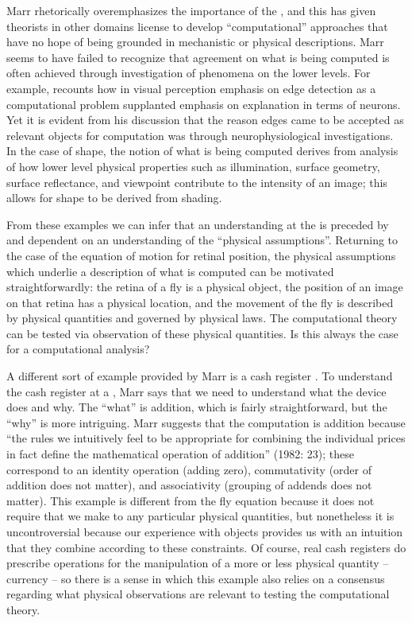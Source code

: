   Marr rhetorically overemphasizes the importance of the , and this has given theorists in other domains license to develop “computational” approaches that have no hope of being grounded in mechanistic or physical descriptions. Marr seems to have failed to recognize that agreement on what is being computed is often achieved through investigation of phenomena on the lower levels. For example, \citet{Marr1982} recounts how in visual perception emphasis on edge detection as a computational problem supplanted emphasis on explanation in terms of neurons. Yet it is evident from his discussion that the reason edges came to be accepted as relevant objects for computation was through neurophysiological investigations. In the case of shape, the notion of what is being computed derives from analysis of how lower level physical properties such as illumination, surface geometry, surface reflectance, and viewpoint contribute to the intensity of an image; this allows for shape to be derived from shading. 

From these examples we can infer that an understanding at the  is preceded by and dependent on an understanding of the “physical assumptions”. Returning to the case of the equation of motion for retinal position, the physical assumptions which underlie a description of what is computed can be motivated straightforwardly: the retina of a fly is a physical object, the position of an image on that retina has a physical location, and the movement of the fly is described by physical quantities and governed by physical laws. The computational theory can be tested via observation of these physical quantities. Is this always the case for a computational analysis?

A different sort of example provided by Marr is a cash register \citep{Marr1982}. To understand the cash register at a , Marr says that we need to understand what the device does and why. The “what” is addition, which is fairly straightforward, but the “why” is more intriguing. Marr suggests that the computation is addition because “the rules we intuitively feel to be appropriate for combining the individual prices in fact define the mathematical operation of addition” (1982: 23); these correspond to an identity operation (adding zero), commutativity (order of addition does not matter), and associativity (grouping of addends does not matter). This example is different from the fly equation because it does not require that we make  to any particular physical quantities, but nonetheless it is uncontroversial because our experience with objects provides us with an intuition that they combine according to these constraints. Of course, real cash registers do prescribe operations for the manipulation of a more or less physical quantity -- currency -- so there is a sense in which this example also relies on a consensus regarding what physical observations are relevant to testing the computational theory.

